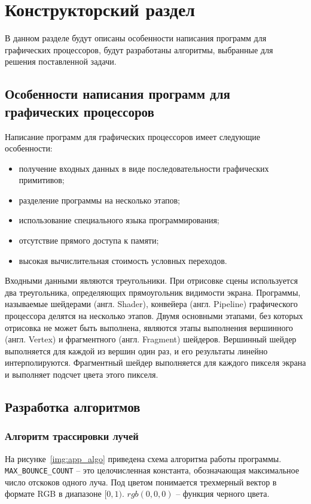 \chapter{Конструкторский раздел}

В данном разделе будут описаны особенности написания программ для графических процессоров, 
будут разработаны алгоритмы, выбранные для решения поставленной задачи.

\section{Особенности написания программ для графических процессоров}

Написание программ для графических процессоров имеет следующие особенности:
\begin{itemize}
    \item получение входных данных в виде последовательности графических примитивов;
    \item разделение программы на несколько этапов;
    \item использование специального языка программирования;
    \item отсутствие прямого доступа к памяти;
    \item высокая вычислительная стоимость условных переходов.
\end{itemize}

Входными данными являются треугольники. При отрисовке сцены используется два треугольника,
определяющих прямоугольник видимости экрана.
Программы, называемые шейдерами (англ. Shader), конвейера (англ. Pipeline) 
графического процессора делятся на несколько этапов. Двумя основными этапами, 
без которых отрисовка не может быть выполнена, являются этапы выполнения вершинного (англ. Vertex) и 
фрагментного (англ. Fragment) шейдеров. Вершинный шейдер выполняется для каждой из вершин один
раз, и его результаты линейно интерполируются. Фрагментный шейдер
выполняется для каждого пикселя экрана и выполняет подсчет цвета этого пикселя.

\section{Разработка алгоритмов}

\subsection{Алгоритм трассировки лучей}

На рисунке~\ref{img:app_algo} приведена схема алгоритма работы программы.
\verb|MAX_BOUNCE_COUNT| -- это целочисленная константа, обозначающая максимальное число
отскоков одного луча. Под цветом понимается
трехмерный вектор в формате RGB в диапазоне $[0, 1)$. $rgb(0,0,0)$ -- функция черного цвета. 

